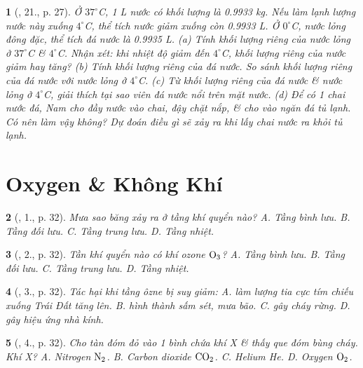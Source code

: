 \documentclass{article}
\newtheorem{baitoan}{}
\begin{document}
\begin{baitoan}[\cite{ncpt_KHTN_6_tap_1}, 21., p. 27]
	Ở $37^\circ${\rm C, 1 L} nước có khối lượng là {\rm0.9933 kg}. Nếu làm lạnh lượng nước này xuống $4^\circ${\rm C}, thể tích nước giảm xuống còn {\rm0.9933 L}. Ở $0^\circ${\rm C}, nước lỏng đông đặc, thể tích đá nước là {\rm0.9935 L}. (a) Tính khối lượng riêng của nước lỏng ở $37^\circ${\rm C} \& $4^\circ${\rm C}. Nhận xét: khi nhiệt độ giảm đến $4^\circ${\rm C}, khối lượng riêng của nước giảm hay tăng? (b) Tính khối lượng riêng của đá nước. So sánh khối lượng riêng của đá nước với nước lỏng ở $4^\circ${\rm C}. (c) Từ khối lượng riêng của đá nước \& nước lỏng ở $4^\circ${\rm C}, giải thích tại sao viên đá nước nổi trên mặt nước. (d) Để có 1 chai nước đá, Nam cho đầy nước vào chai, đậy chặt nắp, \& cho vào ngăn đá tủ lạnh. Có nên làm vậy không? Dự đoán điều gì sẽ xảy ra khi lấy chai nước ra khỏi tủ lạnh.
\end{baitoan}


\section{Oxygen \& Không Khí}

\begin{baitoan}[\cite{ncpt_KHTN_6_tap_1}, 1., p. 32]
	Mưa sao băng xảy ra ở tầng khí quyển nào? {\sf A.} Tầng bình lưu. {\sf B.} Tầng đối lưu. {\sf C.} Tầng trung lưu. {\sf D.} Tầng nhiệt.
\end{baitoan}

\begin{baitoan}[\cite{ncpt_KHTN_6_tap_1}, 2., p. 32]
	Tần khí quyển nào có khí ozone $\rm O_3$? {\sf A.} Tầng bình lưu. {\sf B.} Tầng đối lưu. {\sf C.} Tầng trung lưu. {\sf D.} Tầng nhiệt.
\end{baitoan}

\begin{baitoan}[\cite{ncpt_KHTN_6_tap_1}, 3., p. 32]
	Tác hại khi tầng ôzne bị suy giảm: {\sf A.} làm lượng tia cực tím chiếu xuống Trái Đất tăng lên. {\sf B.} hình thành sấm sét, mưa bão. {\sf C.} gây cháy rừng. {\sf D.} gây hiệu ứng nhà kính.
\end{baitoan}

\begin{baitoan}[\cite{ncpt_KHTN_6_tap_1}, 4., p. 32]
	Cho tàn đóm đỏ vào 1 bình chứa khí X \& thấy que đóm bùng cháy. Khí X? {\sf A.} Nitrogen $\rm N_2$. {\sf B.} Carbon dioxide $\rm CO_2$. {\sf C.} Helium {\rm He}. {\sf D.} Oxygen $\rm O_2$.
\end{baitoan}
\end{document}
